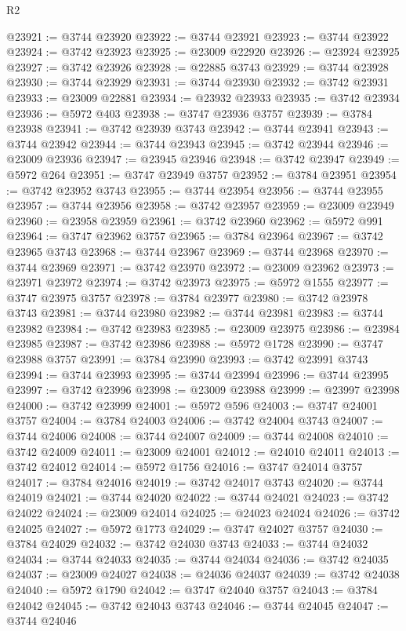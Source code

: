 \begin{lexlean}{R2}
\begin{coremodule}
@23921 := @3744 @23920
@23922 := @3744 @23921
@23923 := @3744 @23922
@23924 := @3742 @23923
@23925 := @23009 @22920
@23926 := @23924 @23925
@23927 := @3742 @23926
@23928 := @22885 @3743
@23929 := @3744 @23928
@23930 := @3744 @23929
@23931 := @3744 @23930
@23932 := @3742 @23931
@23933 := @23009 @22881
@23934 := @23932 @23933
@23935 := @3742 @23934
@23936 := @5972 @403
@23938 := @3747 @23936 @3757
@23939 := @3784 @23938
@23941 := @3742 @23939 @3743
@23942 := @3744 @23941
@23943 := @3744 @23942
@23944 := @3744 @23943
@23945 := @3742 @23944
@23946 := @23009 @23936
@23947 := @23945 @23946
@23948 := @3742 @23947
@23949 := @5972 @264
@23951 := @3747 @23949 @3757
@23952 := @3784 @23951
@23954 := @3742 @23952 @3743
@23955 := @3744 @23954
@23956 := @3744 @23955
@23957 := @3744 @23956
@23958 := @3742 @23957
@23959 := @23009 @23949
@23960 := @23958 @23959
@23961 := @3742 @23960
@23962 := @5972 @991
@23964 := @3747 @23962 @3757
@23965 := @3784 @23964
@23967 := @3742 @23965 @3743
@23968 := @3744 @23967
@23969 := @3744 @23968
@23970 := @3744 @23969
@23971 := @3742 @23970
@23972 := @23009 @23962
@23973 := @23971 @23972
@23974 := @3742 @23973
@23975 := @5972 @1555
@23977 := @3747 @23975 @3757
@23978 := @3784 @23977
@23980 := @3742 @23978 @3743
@23981 := @3744 @23980
@23982 := @3744 @23981
@23983 := @3744 @23982
@23984 := @3742 @23983
@23985 := @23009 @23975
@23986 := @23984 @23985
@23987 := @3742 @23986
@23988 := @5972 @1728
@23990 := @3747 @23988 @3757
@23991 := @3784 @23990
@23993 := @3742 @23991 @3743
@23994 := @3744 @23993
@23995 := @3744 @23994
@23996 := @3744 @23995
@23997 := @3742 @23996
@23998 := @23009 @23988
@23999 := @23997 @23998
@24000 := @3742 @23999
@24001 := @5972 @596
@24003 := @3747 @24001 @3757
@24004 := @3784 @24003
@24006 := @3742 @24004 @3743
@24007 := @3744 @24006
@24008 := @3744 @24007
@24009 := @3744 @24008
@24010 := @3742 @24009
@24011 := @23009 @24001
@24012 := @24010 @24011
@24013 := @3742 @24012
@24014 := @5972 @1756
@24016 := @3747 @24014 @3757
@24017 := @3784 @24016
@24019 := @3742 @24017 @3743
@24020 := @3744 @24019
@24021 := @3744 @24020
@24022 := @3744 @24021
@24023 := @3742 @24022
@24024 := @23009 @24014
@24025 := @24023 @24024
@24026 := @3742 @24025
@24027 := @5972 @1773
@24029 := @3747 @24027 @3757
@24030 := @3784 @24029
@24032 := @3742 @24030 @3743
@24033 := @3744 @24032
@24034 := @3744 @24033
@24035 := @3744 @24034
@24036 := @3742 @24035
@24037 := @23009 @24027
@24038 := @24036 @24037
@24039 := @3742 @24038
@24040 := @5972 @1790
@24042 := @3747 @24040 @3757
@24043 := @3784 @24042
@24045 := @3742 @24043 @3743
@24046 := @3744 @24045
@24047 := @3744 @24046

\end{coremodule}
\end{lexlean}
